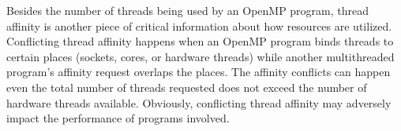 Besides the number of threads being used by an OpenMP program, thread affinity is another piece of critical 
information about how resources are utilized. 
Conflicting thread affinity happens when an OpenMP program binds threads to certain places (sockets, cores, or hardware threads)
while another multithreaded program's affinity request overlaps the places.
The affinity conflicts can happen even the total number of threads requested does not exceed the number of hardware threads available.
Obviously, conflicting thread affinity may adversely impact the performance of programs involved. 

